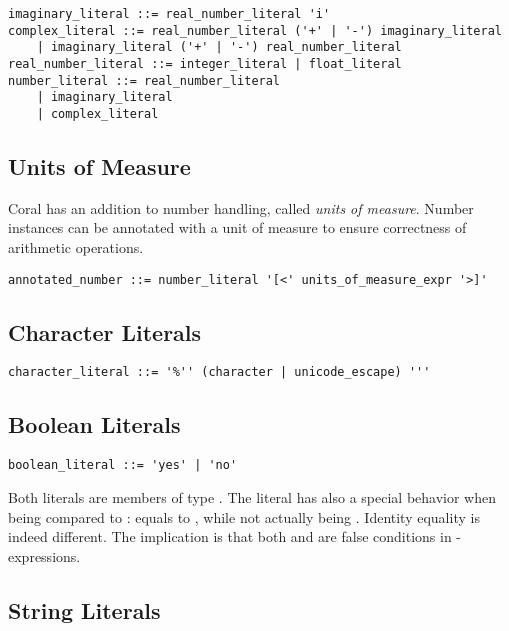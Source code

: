 \syntax\begin{lstlisting}
imaginary_literal ::= real_number_literal 'i'
complex_literal ::= real_number_literal ('+' | '-') imaginary_literal
	| imaginary_literal ('+' | '-') real_number_literal
real_number_literal ::= integer_literal | float_literal
number_literal ::= real_number_literal
	| imaginary_literal
	| complex_literal
\end{lstlisting}

\subsection{Units of Measure}\label{sec:unitsofmeasuresyntax}

Coral has an addition to number handling, called \textit{units of measure}. Number instances can be annotated with a unit of measure to ensure correctness of arithmetic operations. 

\syntax\begin{lstlisting}
annotated_number ::= number_literal '[<' units_of_measure_expr '>]'
\end{lstlisting}

\subsection{Character Literals}\label{sec:characterliterals}

\syntax\begin{lstlisting}
character_literal ::= '%'' (character | unicode_escape) '''
\end{lstlisting}

\subsection{Boolean Literals}\label{sec:booleanliterals}

\syntax\begin{lstlisting}
boolean_literal ::= 'yes' | 'no'
\end{lstlisting}

Both literals are members of type \lstinline@Boolean@. The \lstinline@no@ literal has also a special behavior when being compared to \lstinline@nil@: \lstinline@no@ equals to \lstinline@nil@, while not actually being \lstinline@nil@. Identity equality is indeed different. The implication is that both \lstinline@nil@ and \lstinline@no@ are false conditions in \lstinline@if@-expressions. 

\subsection{String Literals}\label{sec:stringliterals}

